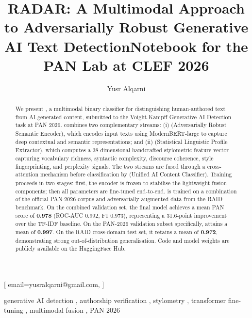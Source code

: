 \documentclass[twocolumn]{ceurart}
\begin{document}


\title{RADAR: A Multimodal Approach to Adversarially Robust Generative AI Text Detection}
\title[mode=sub]{Notebook for the PAN Lab at CLEF 2026}

\author[1]{Yusr Alqarni}[%
  email=yusralqarni@gmail.com,
]
\address[1]{Al-Baha University, Al-Baha, Saudi Arabia}

\begin{abstract}
We present \radar{}, a multimodal binary classifier for distinguishing human-authored text from
AI-generated content, submitted to the Voight-Kampff Generative AI Detection task at PAN 2026.
\radar{} combines two complementary streams: (i) \textbf{\arse{}} (Adversarially Robust Semantic
Encoder), which encodes input texts using ModernBERT-large to capture deep contextual and semantic
representations; and (ii) \textbf{\slpe{}} (Statistical Linguistic Profile Extractor), which
computes a 38-dimensional handcrafted stylometric feature vector capturing vocabulary richness,
syntactic complexity, discourse coherence, style fingerprinting, and perplexity signals. The two
streams are fused through a cross-attention mechanism before classification by \textbf{\uacc{}}
(Unified AI Content Classifier). Training proceeds in two stages: first, the encoder is frozen to
stabilise the lightweight fusion components; then all parameters are fine-tuned end-to-end. \radar{}
is trained on a combination of the official PAN-2026 corpus and adversarially augmented data from
the RAID benchmark. On the combined validation set, the final model achieves a mean PAN score of
\textbf{0.978} (ROC-AUC 0.992, F1 0.973), representing a 31.6-point improvement over the TF-IDF
baseline. On the PAN-2026 validation subset specifically, \radar{} attains a mean of \textbf{0.997}.
On the RAID cross-domain test set, it retains a mean of \textbf{0.972}, demonstrating strong
out-of-distribution generalisation. Code and model weights are publicly available on the
HuggingFace Hub.
\end{abstract}

\begin{keywords}
  generative AI detection \sep
  authorship verification \sep
  stylometry \sep
  transformer fine-tuning \sep
  multimodal fusion \sep
  PAN 2026
\end{keywords}
\end{document}
